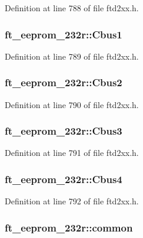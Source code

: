 Definition at line 788 of file ftd2xx.h.\hypertarget{structft__eeprom__232r_aa0ed7fa40a23e6e17359c1fec9dc2677}{
\subsubsection[{Cbus1}]{ {\bf ft\_\-eeprom\_\-232r::Cbus1}}}
\label{structft__eeprom__232r_aa0ed7fa40a23e6e17359c1fec9dc2677}


Definition at line 789 of file ftd2xx.h.\hypertarget{structft__eeprom__232r_a697c610b8e23ae556274c34703fd0582}{
\subsubsection[{Cbus2}]{ {\bf ft\_\-eeprom\_\-232r::Cbus2}}}
\label{structft__eeprom__232r_a697c610b8e23ae556274c34703fd0582}


Definition at line 790 of file ftd2xx.h.\hypertarget{structft__eeprom__232r_af6c591aa67f0e9ff287da8af81f7399e}{
\subsubsection[{Cbus3}]{ {\bf ft\_\-eeprom\_\-232r::Cbus3}}}
\label{structft__eeprom__232r_af6c591aa67f0e9ff287da8af81f7399e}


Definition at line 791 of file ftd2xx.h.\hypertarget{structft__eeprom__232r_a390714a332684ea05618238e7388773f}{
\subsubsection[{Cbus4}]{ {\bf ft\_\-eeprom\_\-232r::Cbus4}}}
\label{structft__eeprom__232r_a390714a332684ea05618238e7388773f}


Definition at line 792 of file ftd2xx.h.\hypertarget{structft__eeprom__232r_a04ed9a15b88229df4567d6c9ccd6c99d}{
\subsubsection[{common}]{ {\bf ft\_\-eeprom\_\-232r::common}}}
\label{structft__eeprom__232r_a04ed9a15b88229df4567d6c9ccd6c99d}


